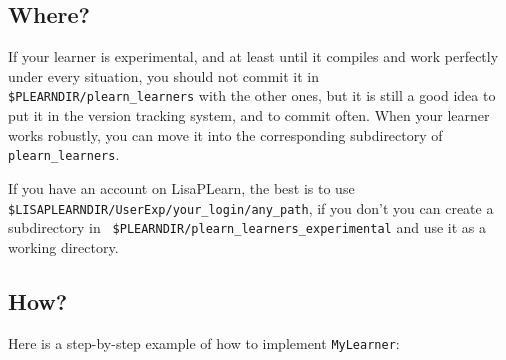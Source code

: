 \documentclass[11pt]{book}
\begin{document}
\subsection{Where?}

If your learner is experimental, and at least until it compiles and
work perfectly under every situation, you should not commit it in {\tt
\$PLEARNDIR/plearn\_learners} with the other ones, but it is still a
good idea to put it in the version tracking system, and to commit often.
When your learner works robustly, you can move it into the corresponding
subdirectory of {\tt plearn\_learners}.

If you have an account on LisaPLearn, the best is to use
{\tt \$LISAPLEARNDIR/UserExp/your\_login/any\_path},
if you don't you can create a subdirectory in {\tt
\$PLEARNDIR/plearn\_learners\_experimental} and use it as a working
directory.

\subsection{How?}

Here is a step-by-step example of how to implement {\tt MyLearner}:
\end{document}
